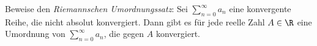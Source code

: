 \begin{prob}
  Beweise den \textit{Riemannschen Umordnungssatz}: Sei $\sum_{n=0}^\infty a_n$
  eine konvergente Reihe, die nicht absolut konvergiert. Dann gibt es für jede
  reelle Zahl $A \in \R$ eine Umordnung von $\sum_{n=0}^\infty a_n$, die gegen
  $A$ konvergiert.
\end{prob}

